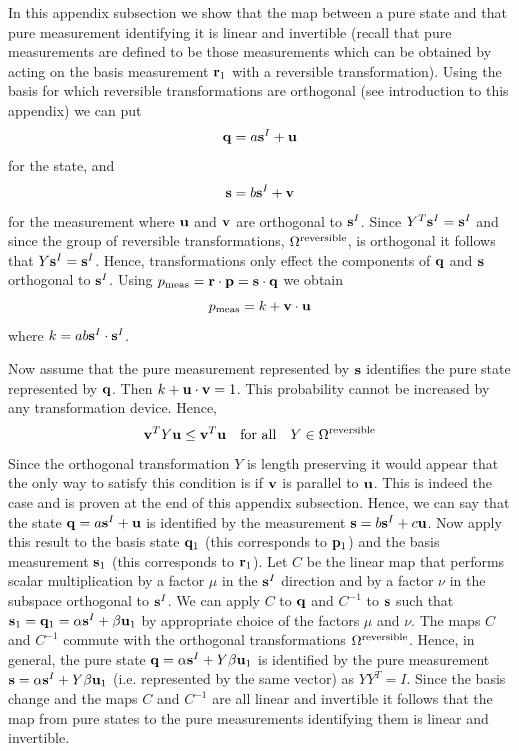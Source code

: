 \documentclass[12pt]{article}
\begin{document}
In this appendix subsection we show that the map between a pure state
and that pure measurement identifying it is linear and invertible
(recall that pure measurements are defined to be those measurements
which can be obtained by acting on the basis measurement ${\bf r}_1$
with a reversible transformation).
Using the basis for which reversible transformations are orthogonal (see
introduction to this appendix) we can put
\begin{equation}
{\bf q}= a {\bf s}^I + {\bf u}
\end{equation}
for the state, and
\begin{equation}
{\bf s}= b {\bf s}^I + {\bf v}
\end{equation}
for the measurement
where ${\bf u}$ and ${\bf v}$ are orthogonal to ${\bf s}^I$.  Since
$Y^T {\bf s}^I={\bf s}^I$ and since the group of reversible
transformations, $\Omega^{\rm reversible}$, is orthogonal it follows
that $Y {\bf s}^I={\bf s}^I$.   Hence, transformations only effect the
components of ${\bf q}$ and ${\bf s}$ orthogonal to ${\bf s}^I$.
Using $p_{\rm meas}={\bf r}\cdot {\bf p}={\bf s}\cdot{\bf q}$ we obtain
\begin{equation}
p_{\rm meas}=k + {\bf v}\cdot{\bf u}
\end{equation}
where $k=ab{\bf s}^I\cdot{\bf s}^I$.

Now assume that the
pure measurement represented by ${\bf s}$ identifies the pure state
represented by ${\bf q}$. Then $k+{\bf u}\cdot {\bf v}=1$.  This
probability cannot be increased by any transformation device. Hence,
\begin{equation}\label{vYu}
{\bf v}^T Y {\bf u} \leq {\bf v}^T {\bf u} ~~~{\rm for~all}~~~
Y\in\Omega^{\rm reversible}
\end{equation}
Since the orthogonal transformation $Y$ is length preserving it would
appear that the only way to satisfy this condition is
if ${\bf v}$ is parallel to ${\bf u}$.  This is indeed the case and is
proven at the end of this appendix subsection.
Hence, we can say that the state ${\bf q}= a {\bf s}^I + {\bf
u}$ is identified by the measurement ${\bf s}= b {\bf s}^I + c{\bf u}$.
Now apply this result to the basis state ${\bf q}_1$ (this corresponds
to ${\bf p}_{1}$) and the basis measurement ${\bf s}_1$ (this
corresponds to ${\bf r}_{1}$).  Let $C$ be the linear map that performs
scalar multiplication by a factor $\mu$ in the ${\bf s}^I$ direction and
by a factor $\nu$ in the subspace orthogonal to ${\bf s}^I$.  We can
apply $C$ to ${\bf q}$ and $C^{-1}$ to ${\bf s}$ such that
${\bf s}_1={\bf q}_1=\alpha{\bf s}^I + \beta{\bf u}_1$ by appropriate choice of
the factors $\mu$ and $\nu$.  The maps $C$ and $C^{-1}$ commute with the
orthogonal transformations $\Omega^{\rm reversible}$. Hence, in general,
the pure state ${\bf q}=\alpha{\bf s}^I + Y\beta{\bf u}_1$ is identified
by the pure measurement ${\bf s}=\alpha{\bf s}^I + Y\beta{\bf u}_1$
(i.e. represented by the same vector) as $YY^T=I$.
Since the basis change and the
maps $C$ and $C^{-1}$ are all linear and invertible it follows that the map from
pure states to the pure measurements identifying them is linear and
invertible.
\end{document}
